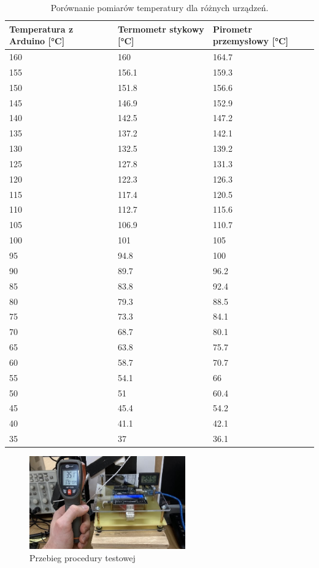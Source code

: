 \begin{table}[h!]
\centering
\begin{tabularx}{\textwidth}{|X|X|X|}
\hline
\textbf{Temperatura z Arduino [°C]} & \textbf{Termometr stykowy [°C]} & \textbf{Pirometr przemysłowy [°C]} \\
\hline
160 & 160 & 164.7 \\
\hline
155 & 156.1 & 159.3 \\
\hline
150 & 151.8 & 156.6 \\
\hline
145 & 146.9 & 152.9 \\
\hline
140 & 142.5 & 147.2 \\
\hline
135 & 137.2 & 142.1 \\
\hline
130 & 132.5 & 139.2 \\
\hline
125 & 127.8 & 131.3 \\
\hline
120 & 122.3 & 126.3 \\
\hline
115 & 117.4 & 120.5 \\
\hline
110 & 112.7 & 115.6 \\
\hline
105 & 106.9 & 110.7 \\
\hline
100 & 101 & 105 \\
\hline
95 & 94.8 & 100 \\
\hline
90 & 89.7 & 96.2 \\
\hline
85 & 83.8 & 92.4 \\
\hline
80 & 79.3 & 88.5 \\
\hline
75 & 73.3 & 84.1 \\
\hline
70 & 68.7 & 80.1 \\
\hline
65 & 63.8 & 75.7 \\
\hline
60 & 58.7 & 70.7 \\
\hline
55 & 54.1 & 66 \\
\hline
50 & 51 & 60.4 \\
\hline
45 & 45.4 & 54.2 \\
\hline
40 & 41.1 & 42.1 \\
\hline
35 & 37 & 36.1 \\
\hline
\end{tabularx}
\caption{Porównanie pomiarów temperatury dla różnych urządzeń.}
\label{tab:pomiary}
\end{table}
\begin{figure}[h!]
    \centering
    \includegraphics[width=0.6\textwidth]{images/test.jpg}
    \caption{Przebieg procedury testowej}
    \label{fig:panel_gorny}
\end{figure}